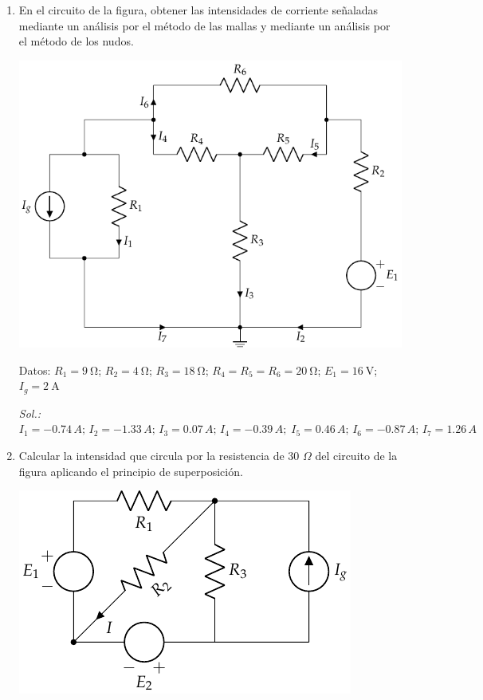 \begin{enumerate}
\item En el circuito de la figura, obtener las
  intensidades de corriente señaladas mediante un análisis por el
  método de las mallas y mediante un análisis por el método de los
  nudos.
  \begin{center}
    \includegraphics{../figs/ej12_BT1.pdf}
  \end{center}

  Datos: $R_1 = \qty{9}{\ohm}$; $R_2 = \qty{4}{\ohm}$; $R_3 = \qty{18}{\ohm}$; $R_4 = R_5 = R_6 = \qty{20}{\ohm}$; $E_1 = \qty{16}{\volt}$; $I_g = \qty{2}{\ampere}$

  \emph{Sol.:
    $I_1=-0.74\,A;\,I_2=-1.33\,A;\,I_3=0.07\,A;\,I_4=-0.39\,A;\;I_5=0.46\,A;\,I_6=-0.87\,A;\,I_7=1.26\,A$}

\item Calcular la intensidad que circula por la resistencia de 30
  $\Omega$ del circuito de la figura aplicando el principio de
  superposición.
  \begin{center}
    \includegraphics{../figs/ej16_BT1.pdf}
  \end{center}


\end{enumerate}
